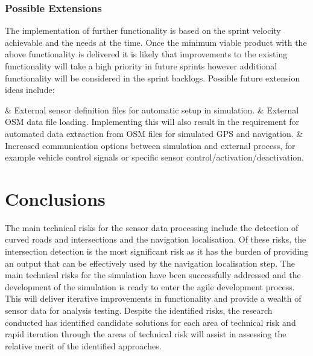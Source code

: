 \documentclass[]{aiaa-tc}%
\begin{document}
\subsubsection{Possible Extensions}

The implementation of further functionality is based on the sprint velocity achievable and the needs at the time. Once the minimum viable product with the above functionality is delivered it is likely that improvements to the existing functionality will take a high priority in future sprints however additional functionality will be considered in the sprint backlogs. Possible future extension ideas include:
\begin{easylist}[itemize]
	& External sensor definition files for automatic setup in simulation.
	& External OSM data file loading. Implementing this will also result in the requirement for automated data extraction from OSM files for simulated GPS and navigation.
	& Increased communication options between simulation and external process, for example vehicle control signals or specific sensor control/activation/deactivation.
\end{easylist}

\section{Conclusions}

The main technical risks for the sensor data processing include the detection of curved roads and intersections and the navigation localisation. Of these risks, the intersection detection is the most significant risk as it has the burden of providing an output that can be effectively used by the navigation localisation step. The main technical risks for the simulation have been successfully addressed and the development of the simulation is ready to enter the agile development process. This will deliver iterative improvements in functionality and provide a wealth of sensor data for analysis testing. Despite the identified risks, the research conducted has identified candidate solutions for each area of technical risk and rapid iteration through the areas of technical risk will assist in assessing the relative merit of the identified approaches.





%
%
\newpage
\end{document}
